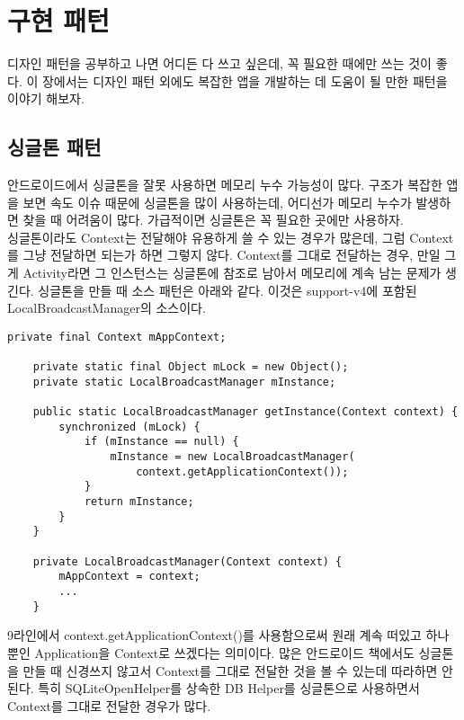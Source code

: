 \chapter{구현 패턴}
디자인 패턴을 공부하고 나면 어디든 다 쓰고 싶은데, 꼭 필요한 때에만 쓰는 것이 좋다.
이 장에서는 디자인 패턴 외에도 복잡한 앱을 개발하는 데 도움이 될 만한 패턴을 이야기 해보자.

\section{싱글톤 패턴}
\label{sec:singleton}
안드로이드에서 싱글톤을 잘못 사용하면 메모리 누수 가능성이 많다. 
구조가 복잡한 앱을 보면 속도 이슈 때문에 싱글톤을 많이 사용하는데, 어디선가 메모리 누수가 발생하면 찾을 때 어려움이 많다. 
가급적이면 싱글톤은 꼭 필요한 곳에만 사용하자.\\

싱글톤이라도 Context는 전달해야 유용하게 쓸 수 있는 경우가 많은데, 그럼 Context를 그냥 전달하면 되는가 하면 그렇지 않다.
Context를 그대로 전달하는 경우, 만일 그게 Activity라면 그 인스턴스는 싱글톤에 참조로 남아서 메모리에 계속 남는 문제가 생긴다.
싱글톤을 만들 때 소스 패턴은 아래와 같다. 이것은 support-v4에 포함된 LocalBroadcastManager의 소스이다.
\begin{lstlisting}[frame=single, caption=LocalBroadcastManager.java]
    private final Context mAppContext;
	
    private static final Object mLock = new Object();
    private static LocalBroadcastManager mInstance;

    public static LocalBroadcastManager getInstance(Context context) {
        synchronized (mLock) {
            if (mInstance == null) {
                mInstance = new LocalBroadcastManager(
                	context.getApplicationContext());
            }
            return mInstance;
        }
    }

    private LocalBroadcastManager(Context context) {
        mAppContext = context;
        ...
    }
\end{lstlisting} 
9라인에서 context.getApplicationContext()를 사용함으로써 원래 계속 떠있고 하나뿐인 Application을 Context로 쓰겠다는 의미이다.
많은 안드로이드 책에서도 싱글톤을 만들 때 신경쓰지 않고서 Context를 그대로 전달한 것을 볼 수 있는데 따라하면 안 된다.
특히 SQLiteOpenHelper를 상속한 DB Helper를 싱글톤으로 사용하면서 Context를 그대로 전달한 경우가 많다.\\

